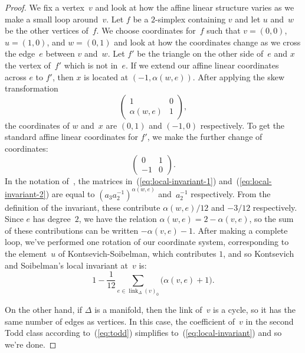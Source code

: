 \documentclass[11pt]{amsart}
\theoremstyle{definition}
\newcommand{\link}{\operatorname{link}}
\begin{document}
\begin{proof}
We fix a vertex~$v$ and look at how the affine linear structure varies as we
make a small loop around~$v$. Let $f$ be a $2$-simplex containing $v$ and let
$u$ and~$w$ be the other vertices of~$f$. We choose coordinates
for~$f$ such that $v = (0,0)$, $u = (1,0)$, and $w=(0,1)$ and look at how
the coordinates change as we cross the edge~$e$ between $v$ and~$w$. Let
$f'$ be the triangle on the other side of~$e$ and $x$ the vertex
of~$f'$ which is not in~$e$. If we extend our affine linear coordinates
across $e$ to $f'$, then $x$ is located at $(-1, \alpha(w, e))$. After applying
the skew transformation
\begin{equation}\label{eq:local-invariant-1}
\begin{pmatrix} 1 & 0 \\ \alpha(w, e) & 1 \end{pmatrix},
\end{equation}
the coordinates of $w$ and~$x$ are $(0, 1)$ and $(-1, 0)$ respectively. To get
the standard affine linear coordinates for $f'$, we make the further change
of coordinates:
\begin{equation}\label{eq:local-invariant-2}
\begin{pmatrix} 0 & 1 \\ -1 & 0 \end{pmatrix}.
\end{equation}
In the notation of~\cite[Sec.~6.5]{kontsevich-soibelman}, the matrices
in~(\ref{eq:local-invariant-1}) and~(\ref{eq:local-invariant-2}) are equal to
$(a_3 a_2^{-1})^{\alpha(w, e)}$ and~$a_2^{-1}$ respectively. From the definition
of the invariant, these contribute $\alpha(w,e)/12$ and $-3/12$ respectively.
Since $e$ has
degree~$2$, we have the relation $\alpha(w, e) = 2 - \alpha(v, e)$, so the sum
of these contributions can be written $-\alpha(v, e) - 1$. After making a complete loop, we've performed one rotation of our coordinate
system, corresponding to the element~$u$ of Kontsevich-Soibelman, which
contributes $1$, and so Kontsevich and Soibelman's local
invariant at~$v$ is:
\begin{equation}\label{eq:local-invariant}
1 - \frac{1}{12} \sum_{e \in \link_{\Delta}(v)_{0}} \big(\alpha(v, e) + 1\big).
\end{equation}

On the other hand, if $\Delta$ is a manifold, then the link of~$v$ is a cycle,
so it has the same number of edges as vertices. In this case, the coefficient
of~$v$ in the second Todd class according to~(\ref{eq:todd}) simplifies
to~(\ref{eq:local-invariant}) and so we're done.
\end{proof}
\end{document}
